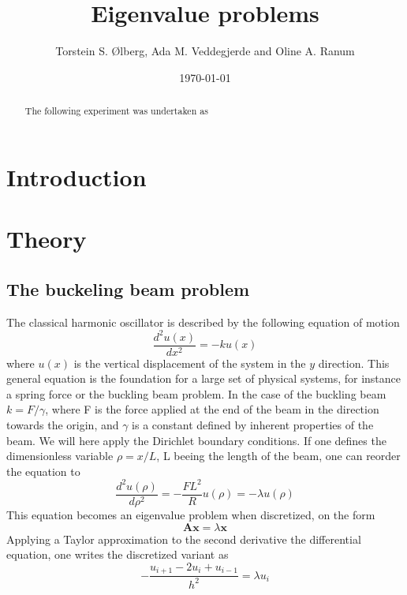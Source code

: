 \documentclass[%
reprint,
amsmath,amssymb,
aps,
]{revtex4-1}
\begin{document}
\title{Eigenvalue problems}
\author{Torstein S. Ølberg, Ada M. Veddegjerde and Oline A. Ranum}
\date{\today}


\begin{abstract}
	The following experiment was undertaken as
\end{abstract}
\maketitle

\section*{Introduction}


\section*{Theory}


\subsection{The buckeling beam problem} \noindent 
The classical harmonic oscillator is described by the following equation of motion
\begin{equation}\label{evp}
 \frac{d^2 u(x)}{dx^2} = -k u(x)
\end{equation}
where $u(x)$ is the vertical displacement of the system in the $y$ direction. This general equation is the foundation for a large set of physical systems, for instance a spring force or the buckling beam problem. In the case of the buckling beam $k = F/\gamma$, where F is the force applied at the end of the beam in the direction towards the origin, and $\gamma$ is a constant defined by inherent properties of the beam. We will here apply the Dirichlet boundary conditions. If one defines the dimensionless variable $\rho = x/L$, L beeing the length of the beam, one can reorder the equation to
\begin{equation}\label{bb}
	 \frac{d^2 u(\rho)}{d\rho^2} = -\frac{FL^2}{R} u(\rho)=-\lambda u(\rho)
\end{equation}
This equation becomes an eigenvalue problem when discretized, on the form 
\begin{equation*}
\mathbf{A}\mathbf{x} = \lambda\mathbf{x}
\end{equation*}
Applying a Taylor approximation to the second derivative the differential equation, one writes the discretized variant as 
\begin{equation}\label{eqdis}
	-\frac{u_{i+1} -2u_i +u_{i-1} }{h^2}  = \lambda u_i
\end{equation}
\end{document}
